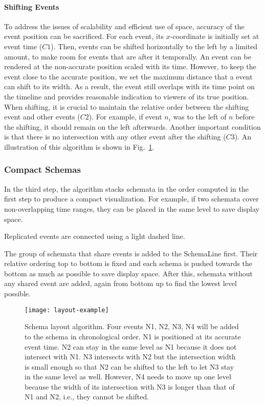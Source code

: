 \paragraph*{Shifting Events}
To address the issues of scalability and efficient use of space, accuracy of the event position can be sacrificed. For each event, its $x$-coordinate is initially set at event time ($C1$). Then, events can be shifted horizontally to the left by a limited amount, to make room for events that are after it temporally. An event can be rendered at the non-accurate position scaled with its time. However, to keep the event close to the accurate position, we set the maximum distance that a event can shift to its width. As a result, the event still overlaps with its time point on the timeline and provides reasonable indication to viewers of its true position. When shifting, it is crucial to maintain the relative order between the shifting event and other events ($C2$). For example, if event $n_i$ was to the left of $n$ before the shifting, it should remain on the left afterwards. Another important condition is that there is no intersection with any other event after the shifting ($C3$). An illustration of this algorithm is shown in Fig.~\ref{fig:layout-schema-example}.

\subsubsection{Compact Schemas}
\label{sub:layout-compact}
In the third step, the algorithm stacks schemata in the order computed in the first step to produce a compact visualization. For example, if two schemata cover non-overlapping time ranges, they can be placed in the same level to save display space. 

Replicated events are connected using a light dashed line.

The group of schemata that share events is added to the SchemaLine first. Their relative ordering top to bottom is fixed and each schema is pushed towards the bottom as much as possible to save display space. After this, schemata without any shared event are added, again from bottom up to find the lowest level possible.

\begin{figure}[ht]
\centering
\texttt{[image: layout-example]}
\caption{Schema layout algorithm. Four events \textrm{N1}, \textrm{N2}, \textrm{N3}, \textrm{N4} will be added to the schema in chronological order. \textrm{N1} is positioned at its accurate event time. \textrm{N2} can stay in the same level as \textrm{N1} because it does not intersect with \textrm{N1}. \textrm{N3} intersects with \textrm{N2} but the intersection width is small enough so that \textrm{N2} can be shifted to the left to let \textrm{N3} stay in the same level as well. However, \textrm{N4} needs to move up one level because the width of its intersection with \textrm{N3} is longer than that of \textrm{N1} and \textrm{N2}, i.e., they cannot be shifted.}
\label{fig:layout-schema-example}
\end{figure}

